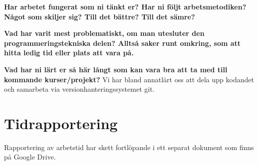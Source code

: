 \documentclass{scrartcl}
\begin{document}
\textbf{Har arbetet fungerat som ni tänkt er? Har ni följt arbetsmetodiken? Något som skiljer sig? Till det bättre? Till det sämre?}



\textbf{Vad har varit mest problematiskt, om man utesluter den programmeringstekniska delen? Alltså saker runt omkring, som att hitta ledig tid eller plats att vara på.}

\textbf{Vad har ni lärt er så här långt som kan vara bra att ta med till kommande kurser/projekt?} Vi har bland annatlärt oss att dela upp kodandet och samarbeta via versionhanteringssystemet git.

\section{Tidrapportering}
Rapportering av arbetstid har skett fortlöpande i ett separat dokument som finns på Google Drive.
\end{document}
